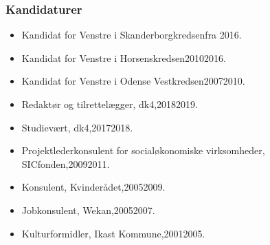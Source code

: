 \documentclass[11pt, a4paper]{awesome-cv}
\begin{document}
\begin{cvletter}
\subsubsection*{Kandidaturer}
\begin{itemize}
\item Kandidat for Venstre i Skanderborgkredsenfra 2016.
\item Kandidat for Venstre i Horsenskredsen20102016.
\item Kandidat for Venstre i Odense Vestkredsen20072010.
\end{itemize}
\begin{itemize}
\item Redaktør og tilrettelægger, dk4,20182019.
\item Studievært, dk4,20172018.
\item Projektlederkonsulent for socialøkonomiske virksomheder, SICfonden,20092011.
\item Konsulent, Kvinderådet,20052009.
\item Jobkonsulent, Wekan,20052007.
\item Kulturformidler, Ikast Kommune,20012005.
\end{itemize}
\end{cvletter}
\end{document}
